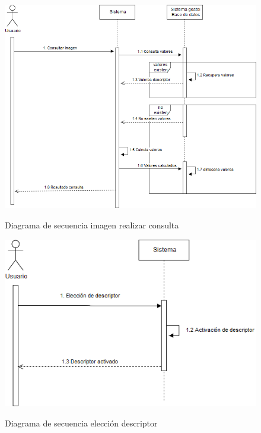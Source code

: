\begin{figure}[H] %
\centering
\includegraphics[scale=0.6]{imagenes/realizarConsulta.png}  %
\label{realizarConsulta.png}
\caption{Diagrama de secuencia imagen realizar consulta}
\end{figure}

\begin{figure}[H] %
\centering
\includegraphics[scale=0.6]{imagenes/eleccionDescriptor.png}  %
\label{realizarConsulta.png}
\caption{Diagrama de secuencia elección descriptor}
\end{figure}


